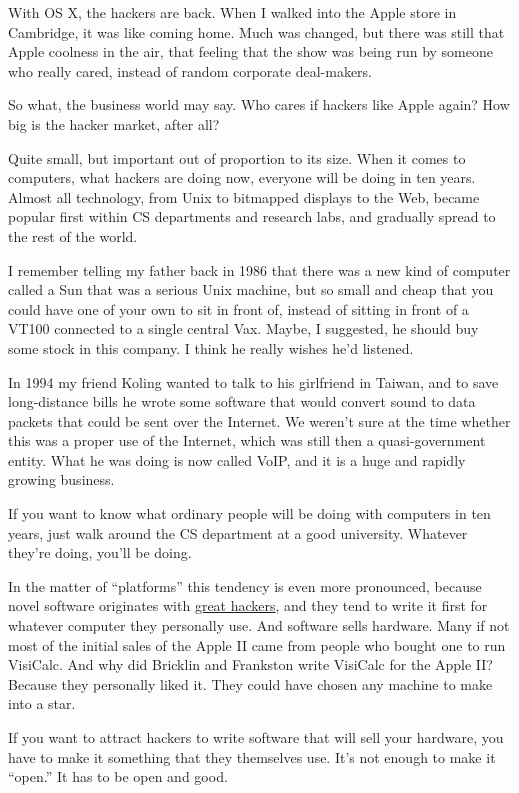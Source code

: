 With OS X, the hackers are back. When I walked into the Apple store in
Cambridge, it was like coming home. Much was changed, but there was
still that Apple coolness in the air, that feeling that the show was
being run by someone who really cared, instead of random corporate
deal-makers.

So what, the business world may say. Who cares if hackers like Apple
again? How big is the hacker market, after all?

Quite small, but important out of proportion to its size. When it comes
to computers, what hackers are doing now, everyone will be doing in ten
years. Almost all technology, from Unix to bitmapped displays to the
Web, became popular first within CS departments and research labs, and
gradually spread to the rest of the world.

I remember telling my father back in 1986 that there was a new kind of
computer called a Sun that was a serious Unix machine, but so small and
cheap that you could have one of your own to sit in front of, instead of
sitting in front of a VT100 connected to a single central Vax. Maybe, I
suggested, he should buy some stock in this company. I think he really
wishes he'd listened.

In 1994 my friend Koling wanted to talk to his girlfriend in Taiwan, and
to save long-distance bills he wrote some software that would convert
sound to data packets that could be sent over the Internet. We weren't
sure at the time whether this was a proper use of the Internet, which
was still then a quasi-government entity. What he was doing is now
called VoIP, and it is a huge and rapidly growing business.

If you want to know what ordinary people will be doing with computers in
ten years, just walk around the CS department at a good university.
Whatever they're doing, you'll be doing.

In the matter of ``platforms'' this tendency is even more pronounced,
because novel software originates with \href{gh.html}{great hackers},
and they tend to write it first for whatever computer they personally
use. And software sells hardware. Many if not most of the initial sales
of the Apple II came from people who bought one to run VisiCalc. And why
did Bricklin and Frankston write VisiCalc for the Apple II? Because they
personally liked it. They could have chosen any machine to make into a
star.

If you want to attract hackers to write software that will sell your
hardware, you have to make it something that they themselves use. It's
not enough to make it ``open.'' It has to be open and good.

